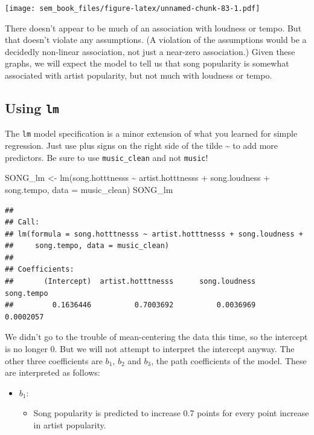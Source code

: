 \documentclass[
]{book}
\newenvironment{Shaded}{\begin{snugshade}}{\end{snugshade}}
\newcommand{\AttributeTok}[1]{\textcolor[rgb]{0.77,0.63,0.00}{#1}}
\newcommand{\FunctionTok}[1]{\textcolor[rgb]{0.00,0.00,0.00}{#1}}
\newcommand{\NormalTok}[1]{#1}
\newcommand{\OtherTok}[1]{\textcolor[rgb]{0.56,0.35,0.01}{#1}}
\newcommand{\SpecialCharTok}[1]{\textcolor[rgb]{0.00,0.00,0.00}{#1}}
\providecommand{\tightlist}{%
  \setlength{\itemsep}{0pt}\setlength{\parskip}{0pt}}
\begin{document}
\texttt{[image: sem\_book\_files/figure-latex/unnamed-chunk-83-1.pdf]}

There doesn't appear to be much of an association with loudness or tempo. But that doesn't violate any assumptions. (A violation of the assumptions would be a decidedly non-linear association, not just a near-zero association.) Given these graphs, we will expect the model to tell us that song popularity is somewhat associated with artist popularity, but not much with loudness or tempo.

\hypertarget{multiple-r-lm}{%
\subsection{\texorpdfstring{Using \texttt{lm}}{Using lm}}\label{multiple-r-lm}}

The \texttt{lm} model specification is a minor extension of what you learned for simple regression. Just use plus signs on the right side of the tilde \textasciitilde{} to add more predictors. Be sure to use \texttt{music\_clean} and not \texttt{music}!

\begin{Shaded}
\begin{Highlighting}[]
\NormalTok{SONG\_lm }\OtherTok{\textless{}{-}} \FunctionTok{lm}\NormalTok{(song.hotttnesss }\SpecialCharTok{\textasciitilde{}}\NormalTok{ artist.hotttnesss }\SpecialCharTok{+}
\NormalTok{                  song.loudness }\SpecialCharTok{+}
\NormalTok{                  song.tempo,}
              \AttributeTok{data =}\NormalTok{ music\_clean)}
\NormalTok{SONG\_lm}
\end{Highlighting}
\end{Shaded}

\begin{verbatim}
## 
## Call:
## lm(formula = song.hotttnesss ~ artist.hotttnesss + song.loudness + 
##     song.tempo, data = music_clean)
## 
## Coefficients:
##       (Intercept)  artist.hotttnesss      song.loudness         song.tempo  
##         0.1636446          0.7003692          0.0036969          0.0002057
\end{verbatim}

We didn't go to the trouble of mean-centering the data this time, so the intercept is no longer 0. But we will not attempt to interpret the intercept anyway. The other three coefficients are \(b_{1}\), \(b_{2}\) and \(b_{3}\), the path coefficients of the model. These are interpreted as follows:

\begin{itemize}
\tightlist
\item
  \(b_{1}\):

  \begin{itemize}
  \tightlist
  \item
    Song popularity is predicted to increase 0.7 points for every point increase in artist popularity.
  \end{itemize}
\end{itemize}
\end{document}
